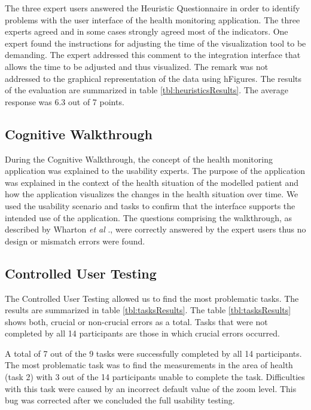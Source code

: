 \documentclass[twocolumn]{bmcart}%
\begin{document}
The three expert users answered the Heuristic Questionnaire in order to identify problems with the user interface of the health monitoring application. The three experts agreed and in some cases strongly agreed most of the indicators. One expert found the instructions for adjusting the time of the visualization tool to be demanding. The expert addressed this comment to the integration interface that allows the time to be adjusted and thus visualized. The remark was not addressed to the graphical representation of the data using hFigures. The results of the evaluation are summarized in table \ref{tbl:heuristicsResults}. The average response was 6.3 out of 7 points.


\subsection*{Cognitive Walkthrough}


During the Cognitive Walkthrough, the concept of the health monitoring application was explained to the usability experts. The purpose of the application was explained in the context of the health situation of the modelled patient and how the application visualizes the changes in the health situation over time. We used the usability scenario and tasks to confirm that the interface supports the intended use of the application. The questions comprising the walkthrough, as described by Wharton \textit{et al} \cite{wharton1994cognitive}., were correctly answered by the expert users thus no design or mismatch errors were found.

\subsection*{Controlled User Testing}

The Controlled User Testing allowed us to find the most problematic tasks. The results are summarized in table \ref{tbl:tasksResults}. The table \ref{tbl:tasksResults} shows both, crucial or non-crucial errors as a total. Tasks that were not completed by all 14 participants are those in which crucial errors occurred.

A total of 7 out of the 9 tasks were successfully completed by all 14 participants. The most problematic task was to find the measurements in the area of health (task 2) with 3 out of the 14 participants unable to complete the task. Difficulties with this task were caused by an incorrect default value of the zoom level. This bug was corrected after we concluded the full usability testing.
\end{document}
